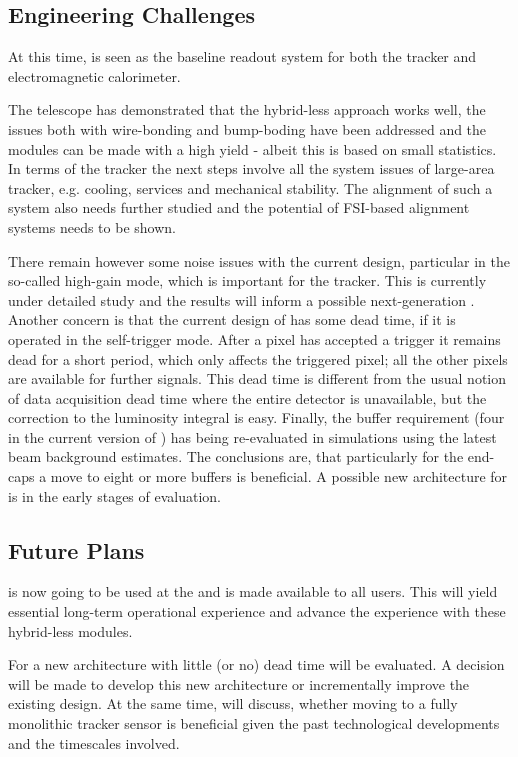 \subsection{Engineering Challenges}
At this time, \KPIX is seen as the baseline readout system for both the \SID tracker and electromagnetic calorimeter. 

The \LYCORIS telescope has demonstrated that the hybrid-less approach works well, the issues both with wire-bonding and 
bump-boding have been addressed and the modules can be made with a high yield - albeit this is based on small statistics.
In terms of the \SID tracker the next steps involve all the system issues of large-area tracker, e.g. cooling, services and mechanical stability. 
The alignment of such a system also needs further studied and the potential of FSI-based alignment systems needs to be shown. 

There remain however some noise issues with the current \KPIX design, particular in the so-called high-gain mode, 
which is important for the tracker. This is currently under detailed study and the results will inform a possible 
next-generation \KPIX. Another concern is that the current design of \KPIX has some dead time, if it is operated in the self-trigger mode. 
After a pixel has accepted a trigger it remains dead for a short period, which only affects the triggered pixel; all the other 
pixels are available for further signals. This dead time is different from the usual 
notion of data acquisition dead time where the entire detector is unavailable, 
but the correction to the luminosity integral is easy. Finally, the buffer 
requirement (four in the current version of \KPIX) has being re-evaluated in \SID  
simulations using the latest beam background estimates. The conclusions are, that particularly for 
the end-caps a move to eight or more buffers is beneficial. A possible new architecture for \KPIX is in 
the early stages of evaluation.

\subsection{Future Plans}
\LYCORIS is now going to be used at the \DIITBF and is made available to all users. This will yield essential long-term operational experience and 
advance the experience with these hybrid-less modules.  

For \KPIX a new architecture with little (or no) dead time will be evaluated. A decision will be made to develop this new architecture or incrementally 
improve the existing design. At the same time, \SID will discuss, whether moving to a fully monolithic tracker sensor is beneficial given the past technological 
developments and the timescales involved.
	
